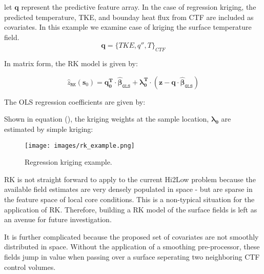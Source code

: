 let $\mathbf{q}$ represent the predictive feature array. In the case of regression kriging, the predicted temperature,
TKE, and bounday heat flux from CTF are included as covariates.
In this example we examine case of kriging the surface temperature field.
\begin{equation}
\mathbf{q} = \{TKE, q'', T\}_{CTF}
\end{equation}

In matrix form, the RK model is given by:

\begin{equation}
\hat z_\mathtt{RK}(\mathbf{s}_0 ) = \mathbf{q}_\mathbf{0}^\mathbf{T} \cdot \mathbf{\hat \beta}_\mathtt{GLS} + \mathbf{\lambda }_\mathbf{0}^\mathbf{T} \cdot (\mathbf{z}
- \mathbf{q} \cdot \mathbf{\hat \beta }_\mathtt{GLS} )
\end{equation}

The OLS regression coefficients are given by:


Shown in equation (), the kriging weights at the sample location, $\mathbf{\lambda_0}$ are estimated by simple kriging:

\begin{figure}[hbtp]
\centering
\texttt{[image: images/rk\_example.png]}
\caption{Regression kriging example.}
\label{fit:rk}
\end{figure}

RK is not straight forward to apply to the current Hi2Low problem because the available field estimates are very densely populated in space - but are sparse in the feature space of local core conditions. This is a non-typical situation for the application of RK. Therefore, building a RK model of the surface fields is left as an avenue for future investigation.

It is further complicated because the proposed set of covariates are not smoothly distributed in space.  Without the application of a smoothing pre-processor, these
fields jump in value when passing over a surface seperating two neighboring CTF control volumes.

